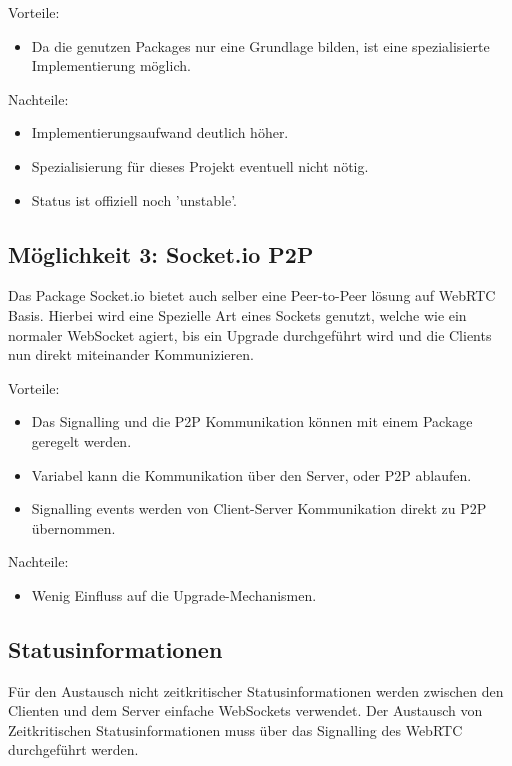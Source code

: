 Vorteile:
\begin{itemize}
\item
Da die genutzen Packages nur eine Grundlage bilden, ist eine spezialisierte Implementierung möglich.
\end{itemize}

Nachteile:
\begin{itemize}
\item
Implementierungsaufwand deutlich höher.

\item
Spezialisierung für dieses Projekt eventuell nicht nötig.

\item
Status ist offiziell noch 'unstable'.
\end{itemize}

\subsection{Möglichkeit 3: Socket.io P2P}
Das Package Socket.io bietet auch selber eine Peer-to-Peer lösung auf WebRTC Basis. Hierbei wird eine Spezielle Art eines Sockets genutzt, welche wie ein normaler WebSocket agiert, bis ein Upgrade durchgeführt wird und die Clients nun direkt miteinander Kommunizieren.


Vorteile:
\begin{itemize}
\item
Das Signalling und die P2P Kommunikation können mit einem Package geregelt werden.

\item
Variabel kann die Kommunikation über den Server, oder P2P ablaufen.

\item
Signalling events werden von Client-Server Kommunikation direkt zu P2P übernommen.
\end{itemize}

Nachteile:
\begin{itemize}
\item
Wenig Einfluss auf die Upgrade-Mechanismen.
\end{itemize}

\subsection{Statusinformationen}
Für den Austausch nicht zeitkritischer Statusinformationen werden zwischen den Clienten und dem Server einfache WebSockets verwendet. Der Austausch von Zeitkritischen Statusinformationen muss über das Signalling des WebRTC durchgeführt werden.

